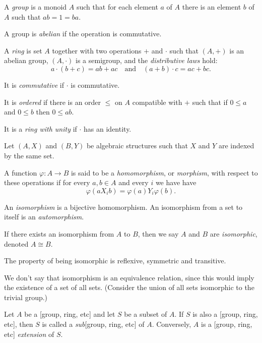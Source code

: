   \begin{defn}
    A \emph{group} is a monoid $A$ such that for each element $a$ of $A$
    there is an element $b$ of $A$ such that
    $ab=1=ba$.
    
    A group is \emph{abelian} if the operation is commutative.
  \end{defn}
  \begin{defn}
    A \emph{ring} is set $A$ together with two operations $+$ and $\cdot$ such
    that $(A,+)$ is an
    abelian group, $(A,\cdot)$ is a semigroup, and the
    \emph{distributive laws} hold:
    \[a\cdot(b+c)=ab+ac\quad\text{and}\quad (a+b)\cdot c=ac+bc.\]

    It is \emph{commutative} if $\cdot$ is commutative.

    It is \emph{ordered} if there is an order $\le$ on $A$ compatible with $+$
    such that if $0\le a$ and $0\le b$ then $0\le ab$.

    It is a \emph{ring with unity} if $\cdot$ has an identity.
  \end{defn}
  \begin{defn}
    Let $(A,X)$ and $(B,Y)$ be algebraic structures such that $X$ and $Y$ are
    indexed by the same set.

    A function $\varphi:A\to B$ is said
    to be a \emph{homomorphism}, or \emph{morphism}, with respect to these operations if
    for every $a,b\in A$ and every $i$ we have
    have \[\varphi(a X_i b)=\varphi(a) Y_i \varphi(b).\]
\end{defn}
\begin{defn}
    An \emph{isomorphism} is a bijective homomorphism. An isomorphism from a set
    to itself is an \emph{automorphism}.

    If there exists an isomorphism from $A$ to $B$, then we say $A$ and $B$ are
    \emph{isomorphic}, denoted $A\cong B$.
  \end{defn}
  \begin{prop}
    The property of being isomorphic is reflexive, symmetric and transitive.
  \end{prop}
  \begin{rem}
    We don't say that isomorphism is an equivalence relation, since this would
    imply the existence of a set of all sets. (Consider the union of all
    sets isomorphic to the trivial group.)
  \end{rem}
  \begin{defn}
      Let $A$ be a [group, ring, etc] and let $S$ be a subset of $A$. 
      If $S$ is also a [group, ring, etc], then $S$ is called a \emph{sub}[group,
      ring, etc] of $A$. Conversely, $A$ is a [group, ring, etc]
      \emph{extension} of $S$.
  \end{defn}
